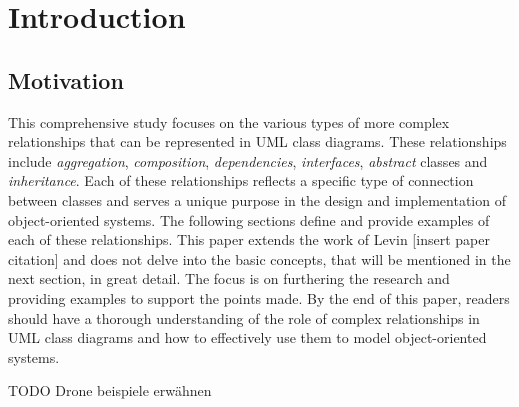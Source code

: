 \documentclass[
	12pt,
    a4paper,
    egregdoesnotlikesansseriftitles, %
    toc=chapterentrywithdots,
    oneside, openany,
    titlepage,
    parskip=half,
    headings=normal,  %
    listof=totoc,
    bibliography=totoc,
    index=totoc,
    captions=tableheading,  %
    listof=flat,
    numbers=noenddot, %
    final]
    {scrbook}
\begin{document}
\setcounter{secnumdepth}{3}  %
\setcounter{tocdepth}{2}  %


\frontmatter


\tableofcontents

\listoffigures
\clearpage %

\listoftables
\clearpage %

\renewcommand{\lstlistlistingname}{List of Listings}  %
\lstlistoflistings
\clearpage %

\mainmatter

\chapter{Introduction}

\section{Motivation}
This comprehensive study focuses on the various types of more complex relationships that can be represented in UML class diagrams. 
These relationships include \emph{aggregation}, \emph{composition}, \emph{dependencies}, \emph{interfaces}, \emph{abstract} classes and \emph{inheritance}. 
Each of these relationships reflects a specific type of connection between classes and serves a unique purpose in the design and implementation of object-oriented systems. 
The following sections define and provide examples of each of these relationships.
This paper extends the work of Levin [insert paper citation] and does not delve into the basic concepts, that will be mentioned in the next section, in great detail. The focus is on furthering the research and providing examples to support the points made.
By the end of this paper, readers should have a thorough understanding of the role of complex relationships in UML class diagrams and how to effectively use them to model object-oriented systems.

TODO Drone beispiele erwähnen
\end{document}
